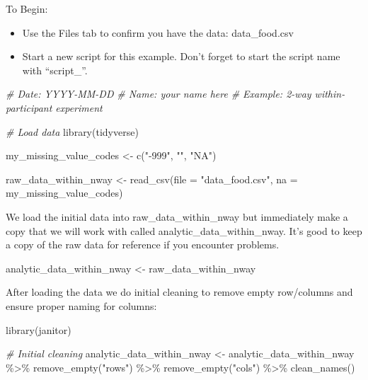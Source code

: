 \documentclass[
]{krantz}
\makeatletter
\newenvironment{Shaded}{\begin{snugshade}}{\end{snugshade}}
\newcommand{\AttributeTok}[1]{\textcolor[rgb]{0.61,0.61,0.61}{#1}}
\newcommand{\CommentTok}[1]{\textcolor[rgb]{0.37,0.37,0.37}{\textit{#1}}}
\newcommand{\FunctionTok}[1]{\textcolor[rgb]{0,0,0}{#1}}
\newcommand{\NormalTok}[1]{#1}
\newcommand{\OtherTok}[1]{\textcolor[rgb]{0.37,0.37,0.37}{#1}}
\newcommand{\SpecialCharTok}[1]{\textcolor[rgb]{0,0,0}{#1}}
\newcommand{\StringTok}[1]{\textcolor[rgb]{0.5,0.5,0.5}{#1}}
\newenvironment{kframe}{%
\medskip{}
\setlength{\fboxsep}{.8em}
 \def\at@end@of@kframe{}%
 \ifinner\ifhmode%
  \def\at@end@of@kframe{\end{minipage}}%
  \begin{minipage}{\columnwidth}%
 \fi\fi%
 \def\FrameCommand##1{\hskip\@totalleftmargin \hskip-\fboxsep
 \colorbox{shadecolor}{##1}\hskip-\fboxsep
     \hskip-\linewidth \hskip-\@totalleftmargin \hskip\columnwidth}%
 \MakeFramed {\advance\hsize-\width
   \@totalleftmargin\z@ \linewidth\hsize
   \@setminipage}}%
 {\par\unskip\endMakeFramed%
 \at@end@of@kframe}
\renewenvironment{Shaded}{\begin{kframe}}{\end{kframe}}
\makeatother
\begin{document}
To Begin:

\begin{itemize}
\item
  Use the Files tab to confirm you have the data: data\_food.csv
\item
  Start a new script for this example. Don't forget to start the script name with ``script\_''.
\end{itemize}

\begin{Shaded}
\begin{Highlighting}[]
\CommentTok{\# Date: YYYY{-}MM{-}DD}
\CommentTok{\# Name: your name here}
\CommentTok{\# Example: 2{-}way within{-}participant experiment}

\CommentTok{\# Load data}
\FunctionTok{library}\NormalTok{(tidyverse)}

\NormalTok{my\_missing\_value\_codes }\OtherTok{\textless{}{-}} \FunctionTok{c}\NormalTok{(}\StringTok{"{-}999"}\NormalTok{, }\StringTok{""}\NormalTok{, }\StringTok{"NA"}\NormalTok{)}

\NormalTok{raw\_data\_within\_nway }\OtherTok{\textless{}{-}} \FunctionTok{read\_csv}\NormalTok{(}\AttributeTok{file =} \StringTok{"data\_food.csv"}\NormalTok{,}
                     \AttributeTok{na =}\NormalTok{ my\_missing\_value\_codes)}
\end{Highlighting}
\end{Shaded}

We load the initial data into raw\_data\_within\_nway but immediately make a copy that we will work with called analytic\_data\_within\_nway. It's good to keep a copy of the raw data for reference if you encounter problems.

\begin{Shaded}
\begin{Highlighting}[]
\NormalTok{analytic\_data\_within\_nway }\OtherTok{\textless{}{-}}\NormalTok{ raw\_data\_within\_nway}
\end{Highlighting}
\end{Shaded}

After loading the data we do initial cleaning to remove empty row/columns and ensure proper naming for columns:

\begin{Shaded}
\begin{Highlighting}[]
\FunctionTok{library}\NormalTok{(janitor)}

\CommentTok{\# Initial cleaning}
\NormalTok{analytic\_data\_within\_nway }\OtherTok{\textless{}{-}}\NormalTok{ analytic\_data\_within\_nway }\SpecialCharTok{\%\textgreater{}\%}
  \FunctionTok{remove\_empty}\NormalTok{(}\StringTok{"rows"}\NormalTok{) }\SpecialCharTok{\%\textgreater{}\%}
  \FunctionTok{remove\_empty}\NormalTok{(}\StringTok{"cols"}\NormalTok{) }\SpecialCharTok{\%\textgreater{}\%}
  \FunctionTok{clean\_names}\NormalTok{()}
\end{Highlighting}
\end{Shaded}
\end{document}
